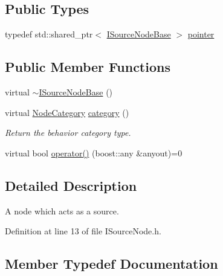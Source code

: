 \subsection*{Public Types}
\begin{DoxyCompactItemize}
\item 
typedef std\+::shared\+\_\+ptr$<$ \hyperlink{class_wire_cell_1_1_i_source_node_base}{I\+Source\+Node\+Base} $>$ \hyperlink{class_wire_cell_1_1_i_source_node_base_a40248dae2503a1039343cd98f15e9519}{pointer}
\end{DoxyCompactItemize}
\subsection*{Public Member Functions}
\begin{DoxyCompactItemize}
\item 
virtual \hyperlink{class_wire_cell_1_1_i_source_node_base_a4e3908b689f6cb4b826bac0ecc3ad8a2}{$\sim$\+I\+Source\+Node\+Base} ()
\item 
virtual \hyperlink{class_wire_cell_1_1_i_node_a5546e64cbb70bd3ac787295cac9ac803}{Node\+Category} \hyperlink{class_wire_cell_1_1_i_source_node_base_adc531c3da5aa3192940e60390e683736}{category} ()
\begin{DoxyCompactList}\small\item\em Return the behavior category type. \end{DoxyCompactList}\item 
virtual bool \hyperlink{class_wire_cell_1_1_i_source_node_base_a6d29d551ab4e4b8479a062dfaa38f42f}{operator()} (boost\+::any \&anyout)=0
\end{DoxyCompactItemize}


\subsection{Detailed Description}
A node which acts as a source. 

Definition at line 13 of file I\+Source\+Node.\+h.



\subsection{Member Typedef Documentation}
\mbox{\label{class_wire_cell_1_1_i_source_node_base_a40248dae2503a1039343cd98f15e9519}} 
